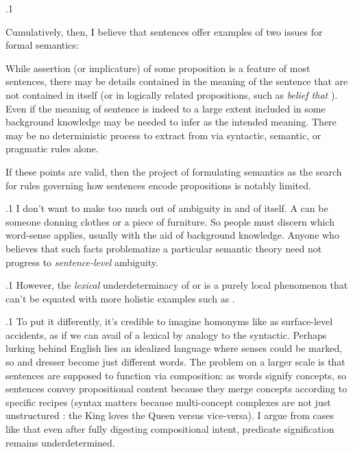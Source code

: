 \documentclass[11pt, twocolumn]{article}
\begin{document}
\p.1{%
Cumulatively, then, I believe that sentences \onethrft{} offer examples
of two issues for formal semantics:

\begin{enums}

\enumsItem{}   While assertion (or implicature) of some proposition  is a
feature of most sentences, there may be details contained in
the meaning of the sentence that are not contained in  itself
(or in logically related propositions, such as \textit{belief that }). 
\enumsItem{}   Even if the meaning of sentence  is indeed to a large extent included in some
 background knowledge may be needed to infer  as the intended
meaning.  There may be no deterministic process to extract  from
 via syntactic, semantic, or pragmatic rules alone.

\end{enums}

\nip
If these points are valid, then the project of formulating semantics as the search
for rules governing how sentences  encode propositions  is notably limited.
} %

\p.1{%
I don't want to make too much out of ambiguity in and of itself.
A  can be someone donning clothes or a piece of furniture.
So people must discern which word-sense applies, usually with the aid of background knowledge.
Anyone who believes that such facts problematize a particular semantic theory
need not progress to \textit{sentence-level} ambiguity.
} %

\p.1{%
However, the \textit{lexical} underdeterminacy of  or 
is a purely local phenomenon that can't be equated with more holistic
examples such as \onethrft{}.
} %

\p.1{%
To put it differently, it's credible to imagine homonyms like 
as surface-level accidents, as if we can avail of a
lexical  by analogy to the syntactic.
Perhaps lurking behind English lies an idealized language where senses
could be marked, so  and  dresser become just
different words.  The problem on a larger scale is that sentences are supposed to
function via composition: as words signify concepts, so sentences
convey propositional content because they merge concepts according
to specific recipes (syntax matters because multi-concept complexes
are not just unstructured : the King loves the Queen versus vice-versa).
I argue from cases like \onethrft{} that even after fully digesting
compositional intent, predicate signification remains underdetermined.
} %
\end{document}
